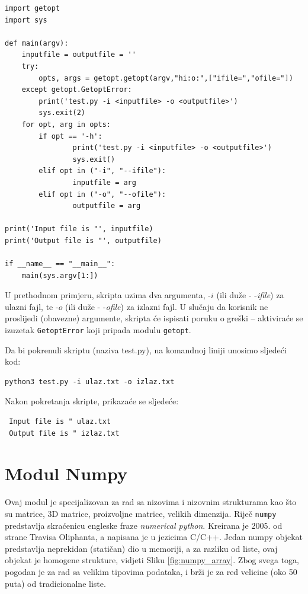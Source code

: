 \begin{verbatim}
import getopt
import sys

def main(argv):
    inputfile = outputfile = ''
    try:
        opts, args = getopt.getopt(argv,"hi:o:",["ifile=","ofile="])
    except getopt.GetoptError:
        print('test.py -i <inputfile> -o <outputfile>')
        sys.exit(2)
    for opt, arg in opts:
        if opt == '-h':
                print('test.py -i <inputfile> -o <outputfile>')
                sys.exit()
        elif opt in ("-i", "--ifile"):
                inputfile = arg
        elif opt in ("-o", "--ofile"):
                outputfile = arg

print('Input file is "', inputfile)
print('Output file is "', outputfile)

if __name__ == "__main__":
    main(sys.argv[1:])
\end{verbatim}
U prethodnom primjeru, skripta uzima dva argumenta, -$i$ (ili duže - -\emph{ifile}) za ulazni fajl, te -$o$ (ili duže - -\emph{ofile}) 
za izlazni fajl. U slučaju da korisnik ne proslijedi (obavezne) argumente, skripta će ispisati poruku o greški -- aktiviraće se izuzetak \texttt{GetoptError} koji pripada modulu \texttt{getopt}. 

 Da bi pokrenuli skriptu (naziva test.py), na komandnoj liniji unosimo sljedeći kod:
 \begin{verbatim}
python3 test.py -i ulaz.txt -o izlaz.txt
 \end{verbatim}
 Nakon pokretanja skripte, prikazaće se sljedeće:
 \begin{verbatim}
 Input file is " ulaz.txt
 Output file is " izlaz.txt
 \end{verbatim}

\section{Modul Numpy}

Ovaj modul je specijalizovan za rad sa nizovima i nizovnim strukturama kao što su
matrice, 3D matrice, proizvoljne matrice,  velikih dimenzija. Riječ \texttt{numpy} predstavlja skraćenicu  engleske fraze \emph{numerical python}.  Kreirana je 2005. od strane Travisa Oliphanta, a napisana je u jezicima C/C++. Jedan numpy  objekat predstavlja neprekidan (statičan) dio u memoriji, a za razliku od liste, ovaj objekat je homogene strukture, vidjeti Sliku 	\ref{fig:numpy_array}. Zbog svega toga, pogodan je   za rad  sa velikim tipovima podataka, i brži je za red velicine (oko 50 puta) od tradicionalne liste.


